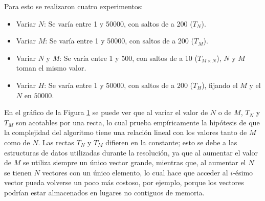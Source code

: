     Para esto se realizaron cuatro experimentos:
    \begin{itemize}
        \item Variar $N$: Se varía entre 1 y 50000, con saltos de a 200 ($T_N$).
        \item Variar $M$: Se varía entre 1 y 50000, con saltos de a 200 ($T_M$).
        \item Variar $N$ y $M$: Se varía entre 1 y 500, con saltos de a 10 ($T_{M \times N}$), $N$ y $M$ toman el mismo valor.
        \item Variar $H$: Se varía entre 1 y 50000, con saltos de a 200 ($T_H$), fijando el $M$ y el $N$ en $50000$.
    \end{itemize}

    \begin{figure}[H]
        \centering
        \caption{}
        \label{fig:exp3:var-nym-base}
    \end{figure}

    En el gráfico de la Figura \ref{fig:exp3:var-nym-base} se puede ver que al variar el valor de $N$ o de $M$, $T_N$ y $T_M$ son acotables por una recta, lo cual prueba empíricamente la hipótesis de que la complejidad del algoritmo tiene una relación lineal con los valores tanto de $M$ como de $N$. Las rectas $T_N$ y $T_M$ difieren en la constante; esto se debe a las estructuras de datos utilizadas durante la resolución, ya que al aumentar el valor de $M$ se utiliza siempre un único vector grande, mientras que, al aumentar el $N$ se tienen $N$ vectores con un único elemento, lo cual hace que acceder al $i$-ésimo vector pueda volverse un poco más costoso, por ejemplo, porque los vectores podrían estar almacenados en lugares no contiguos de memoria.


